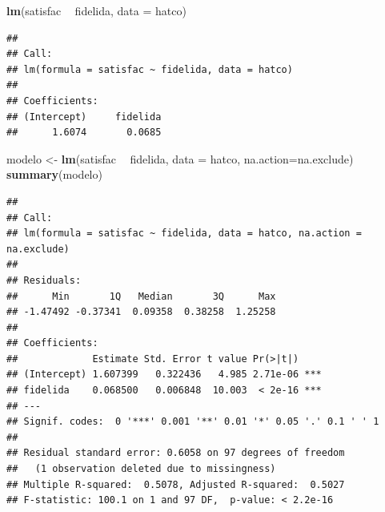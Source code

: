 \documentclass[]{book}
\newenvironment{Shaded}{\begin{snugshade}}{\end{snugshade}}
\newcommand{\CommentTok}[1]{\textcolor[rgb]{0.56,0.35,0.01}{\textit{#1}}}
\newcommand{\DataTypeTok}[1]{\textcolor[rgb]{0.13,0.29,0.53}{#1}}
\newcommand{\KeywordTok}[1]{\textcolor[rgb]{0.13,0.29,0.53}{\textbf{#1}}}
\newcommand{\NormalTok}[1]{#1}
\newcommand{\OperatorTok}[1]{\textcolor[rgb]{0.81,0.36,0.00}{\textbf{#1}}}
\newcommand{\StringTok}[1]{\textcolor[rgb]{0.31,0.60,0.02}{#1}}
\begin{document}
\begin{Shaded}
\begin{Highlighting}[]
\KeywordTok{lm}\NormalTok{(satisfac }\OperatorTok{~}\StringTok{ }\NormalTok{fidelida, }\DataTypeTok{data =}\NormalTok{ hatco)}
\end{Highlighting}
\end{Shaded}

\begin{verbatim}
## 
## Call:
## lm(formula = satisfac ~ fidelida, data = hatco)
## 
## Coefficients:
## (Intercept)     fidelida  
##      1.6074       0.0685
\end{verbatim}

\begin{Shaded}
\begin{Highlighting}[]
\NormalTok{modelo <-}\StringTok{ }\KeywordTok{lm}\NormalTok{(satisfac }\OperatorTok{~}\StringTok{ }\NormalTok{fidelida, }\DataTypeTok{data =}\NormalTok{ hatco, }\DataTypeTok{na.action=}\NormalTok{na.exclude)}
\KeywordTok{summary}\NormalTok{(modelo)}
\end{Highlighting}
\end{Shaded}

\begin{verbatim}
## 
## Call:
## lm(formula = satisfac ~ fidelida, data = hatco, na.action = na.exclude)
## 
## Residuals:
##      Min       1Q   Median       3Q      Max 
## -1.47492 -0.37341  0.09358  0.38258  1.25258 
## 
## Coefficients:
##             Estimate Std. Error t value Pr(>|t|)    
## (Intercept) 1.607399   0.322436   4.985 2.71e-06 ***
## fidelida    0.068500   0.006848  10.003  < 2e-16 ***
## ---
## Signif. codes:  0 '***' 0.001 '**' 0.01 '*' 0.05 '.' 0.1 ' ' 1
## 
## Residual standard error: 0.6058 on 97 degrees of freedom
##   (1 observation deleted due to missingness)
## Multiple R-squared:  0.5078, Adjusted R-squared:  0.5027 
## F-statistic: 100.1 on 1 and 97 DF,  p-value: < 2.2e-16
\end{verbatim}

\begin{Shaded}
\end{Shaded}
\end{document}
